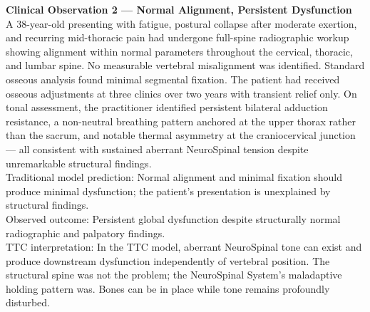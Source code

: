 \documentclass[11pt,letterpaper]{article}
\begin{document}
\begin{vignetteinner}
{\normalfont\bfseries Clinical Observation 2 — Normal Alignment, Persistent Dysfunction}\\[4pt]
A 38-year-old presenting with fatigue, postural collapse after moderate exertion, and recurring mid-thoracic pain had undergone full-spine radiographic workup showing alignment within normal parameters throughout the cervical, thoracic, and lumbar spine. No measurable vertebral misalignment was identified. Standard osseous analysis found minimal segmental fixation. The patient had received osseous adjustments at three clinics over two years with transient relief only. On tonal assessment, the practitioner identified persistent bilateral adduction resistance, a non-neutral breathing pattern anchored at the upper thorax rather than the sacrum, and notable thermal asymmetry at the craniocervical junction — all consistent with sustained aberrant NeuroSpinal tension despite unremarkable structural findings.\\[2pt]
Traditional model prediction: Normal alignment and minimal fixation should produce minimal dysfunction; the patient's presentation is unexplained by structural findings.\\[2pt]
Observed outcome: Persistent global dysfunction despite structurally normal radiographic and palpatory findings.\\[2pt]
TTC interpretation: In the TTC model, aberrant NeuroSpinal tone can exist and produce downstream dysfunction independently of vertebral position. The structural spine was not the problem; the NeuroSpinal System's maladaptive holding pattern was. Bones can be in place while tone remains profoundly disturbed.\\[2pt]
\end{vignetteinner}
\end{document}
